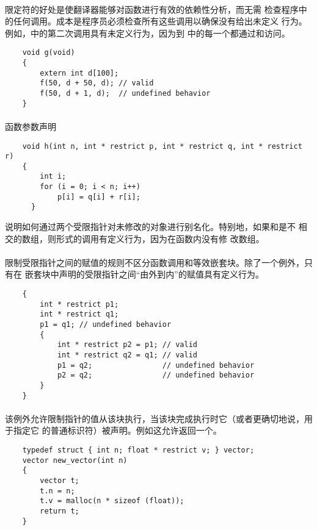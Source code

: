 {\paragraph{}
限定符的好处是使翻译器能够对函数进行有效的依赖性分析，而无需
检查程序中的任何调用。成本是程序员必须检查所有这些调用以确保没有给出未定义
行为。例如，中的第二次调用具有未定义行为，因为到
中的每一个都通过和访问。
\begin{lstlisting}
    void g(void)
    {
        extern int d[100];
        f(50, d + 50, d); // valid
        f(50, d + 1, d);  // undefined behavior
    }
\end{lstlisting}

\paragraph{}
\ex 函数参数声明
\begin{lstlisting}
    void h(int n, int * restrict p, int * restrict q, int * restrict r)
    {
        int i;
        for (i = 0; i < n; i++)
            p[i] = q[i] + r[i];
      }
\end{lstlisting}
说明如何通过两个受限指针对未修改的对象进行别名化。特别地，如果和是不
相交的数组，则形式的调用有定义行为，因为在函数内没有修
改数组。

\paragraph{}
\ex 限制受限指针之间的赋值的规则不区分函数调用和等效嵌套块。除了一个例外，只有在
嵌套块中声明的受限指针之间``由外到内''的赋值具有定义行为。
\begin{lstlisting}
    {
        int * restrict p1;
        int * restrict q1;
        p1 = q1; // undefined behavior
        {
            int * restrict p2 = p1; // valid
            int * restrict q2 = q1; // valid
            p1 = q2;                // undefined behavior
            p2 = q2;                // undefined behavior
        }
    }
\end{lstlisting}

\paragraph{}
该例外允许限制指针的值从该块执行，当该块完成执行时它（或者更确切地说，用于指定它
的普通标识符）被声明。例如这允许返回一个。
\begin{lstlisting}
    typedef struct { int n; float * restrict v; } vector;
    vector new_vector(int n)
    {
        vector t;
        t.n = n;
        t.v = malloc(n * sizeof (float));
        return t;
    }
\end{lstlisting}

}
